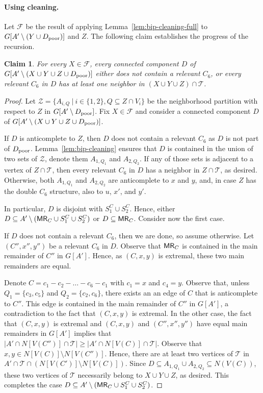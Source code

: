 \documentclass[11pt,a4paper]{article}
\newtheorem{claim}[theorem]{Claim}
\theoremstyle{definition}
\def\T{\mathcal{T}}
\begin{document}
\paragraph{Using cleaning.}
Let $\mathcal{F}$ be the result of applying Lemma~\ref{lem:bip-cleaning-full}
to $G[A' \setminus (Y \cup D_{\mathrm{poor}})]$ and $Z$. 
The following claim establishes the progress of the recursion. 
\begin{claim}\label{cl:cleaning-progress}
For every $X \in \mathcal{F}$, every connected component $D$ of
$G[A' \setminus (X \cup Y \cup Z \cup D_{\mathrm{poor}})]$ either does not contain a relevant $C_6$,
  or every relevant $C_6$ in $D$ has at least one neighbor in $(X \cup Y \cup Z) \cap \T$. 
\end{claim}
\begin{proof}
    Let $\mathcal{Z} = \{A_{i,Q}~|~i \in \{1,2\}, Q \subseteq Z \cap V_i\}$
    be the neighborhood partition  with respect to $Z$ in $G[A' \setminus D_{\mathrm{poor}}]$.
    Fix $X \in \mathcal{F}$ and consider a connected component $D$ of $G[A' \setminus (X \cup Y \cup Z \cup D_{\mathrm{poor}})]$.
    
    If $D$ is anticomplete to $Z$, then $D$ does not contain a relevant $C_6$ as $D$ is not part of $D_{\mathrm{poor}}$. 
    Lemma~\ref{lem:bip-cleaning} ensures that $D$ is contained in the union
    of two sets of $\mathcal{Z}$, denote them $A_{1,Q_1}$ and $A_{2,Q_2}$. 
    If any of those sets is adjacent to a vertex of $Z \cap \T$, 
    then every relevant $C_6$ in $D$ has a neighbor in $Z \cap \T$, as desired.
    Otherwise, both $A_{1,Q_1}$ and $A_{2,Q_2}$ are anticomplete to $x$ and $y$,
    and, in case $Z$ has the double $C_6$ structure, also to $u$, $x'$, and $y'$. 

    In particular, $D$ is disjoint with $S_1^C \cup S_2^C$. Hence, either 
    $D \subseteq A' \setminus (\mathsf{MR}_C \cup S_1^C \cup S_2^C)$ or $D \subseteq \mathsf{MR}_C$. Consider now the first case. 

    If $D$ does not contain a relevant $C_6$, then we are done, so assume otherwise. 
    Let $(C'',x'',y'')$ be a relevant $C_6$ in $D$. Observe that $\mathsf{MR}_C$
    is contained in the main remainder of $C''$ in $G[A']$. Hence, as $(C,x,y)$ is extremal,
    these two main remainders are equal.
    
    Denote $C = c_1-c_2-\ldots-c_6-c_1$ with $c_1=x$ and $c_4=y$. 
    Observe that, unless $Q_1 = \{c_3,c_5\}$ and $Q_2 = \{c_2,c_6\}$, there exists
    an an edge of $C$ that is anticomplete to $C''$. This edge is contained in the main
    remainder of $C''$ in $G[A']$, a contradiction to the fact that $(C,x,y)$ is extremal. 
    In the other case, the fact that $(C,x,y)$ is extremal and $(C,x,y)$ and $(C'',x'',y'')$
    have equal main remainders in $G[A']$ implies that 
    $|A' \cap N[V(C'')] \cap \T| \geq |A' \cap N[V(C)] \cap \T|$.
    Observe that $x,y \in N[V(C)] \setminus N[V(C'')]$. 
    Hence, there are at least two vertices of $\T$ in $A' \cap \T \cap (N[V(C')] \setminus N[V(C)])$.
    Since $D \subseteq A_{1,Q_1} \cup A_{2,Q_2} \subseteq N(V(C))$, 
    these two vertices of $\T$ necessarily belong to $X \cup Y \cup Z$, as desired. 
    This completes the case $D \subseteq A' \setminus (\mathsf{MR}_C \cup S_1^C \cup S_2^C)$. 


\end{proof}
\end{document}
